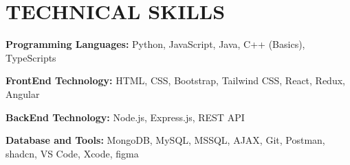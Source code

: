 \documentclass[letterpaper,11pt]{article}
\begin{document}
\noindent
\begin{minipage}[t]{0.48\textwidth}
    \section{\color{airforceblue}TECHNICAL SKILLS}
    \begin{itemize}[leftmargin=0in, label={}]
        \small{\item{
            \textbf{\normalsize{Programming Languages:}}{ \normalsize{Python, JavaScript, Java, C++ (Basics), TypeScripts}} \\
            \vspace{-12pt}
      
            \textbf{\normalsize{FrontEnd Technology:}}{ \normalsize{HTML, CSS, Bootstrap, Tailwind CSS,  React, Redux, Angular}} \\
            \vspace{-12pt}
      
            \textbf{\normalsize{BackEnd Technology:}}{ \normalsize{Node.js, Express.js, REST API}} \\
            \vspace{-12pt}
      
            \textbf{\normalsize{Database and Tools:}}{ \normalsize{MongoDB, MySQL, MSSQL, AJAX, Git, Postman, shadcn, VS Code, Xcode, figma}}
        }}
    \end{itemize}
\end{minipage}
\hfill
\vrule{} %
\hfill
\end{document}
